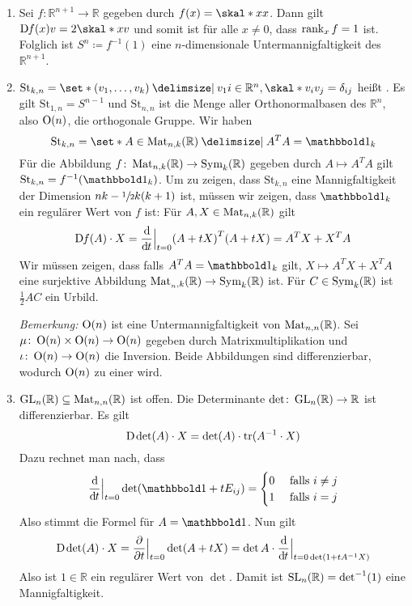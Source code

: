\begin{beispiel}
	\begin{enumerate}[1)]
		\item Sei $f \colon \mathbb{R}^{n+1} \to \mathbb{R}$ gegeben durch $f(x) = \skal*{x}{x}$.
		Dann gilt $\D f(x) v = 2 \skal*{x}{v}$ und somit ist für alle $x\neq 0$, dass $\rank_x f = 1$ ist.
		Folglich ist $S^n \coloneqq f^{-1}(1)$ eine $n$-dimensionale Untermannigfaltigkeit des $\mathbb{R}^{n+1}$.
		\item $\mathrm{St}_{k,n} = \set*{(v_1, \ldots,v_k) \given v_1i \in \mathbb{R}^n, \skal*{v_i}{v_j} = \delta_{ij}}$ heißt .
		Es gilt $\mathrm{St}_{1,n}=S^{n-1}$ und $\mathrm{St}_{n,n}$ ist die Menge aller Orthonormalbasen des $\mathbb{R}^n$, also $\On(n)$, die orthogonale Gruppe.
		Wir haben
		\[
			\mathrm{St}_{k,n} = \set*{A \in \Mat_{n,k}(\mathbb{R}) \given A^T A = \ind_k}
		\]
		Für die Abbildung $f \colon \Mat_{n,k}(\mathbb{R}) \to \Sym_{k}(\mathbb{R})$ gegeben durch $A \mapsto A^T A$ gilt $\mathrm{St}_{k,n} = f^{-1}(\ind_k)$.
		Um zu zeigen, dass $\mathrm{St}_{k,n}$ eine Mannigfaltigkeit der Dimension $nk - \sfrac{1}{2}k(k+1)$ ist, müssen wir zeigen, dass $\ind_k$ ein regulärer Wert von $f$ ist:
		Für $A,X \in \Mat_{n,k}(\mathbb{R})$ gilt
		\begin{align}
			\D f(A) \cdot X = \diffd{}{t}\Big|_{t=0} \enbrace*{A + tX}^T \enbrace*{A + tX} = A^T X+ X^T A
		\end{align}
		Wir müssen zeigen, dass falls $A^T A = \ind_k$ gilt, $X \mapsto A^T X + X^T A$ eine surjektive Abbildung $\Mat_{_n,k}(\mathbb{R}) \to \Sym_k(\mathbb{R})$ ist.
		Für $C \in \Sym_k(\mathbb{R})$ ist $\frac{1}{2} AC$ ein Urbild.
		
		\emph{Bemerkung:} $\On(n)$ ist eine Untermannigfaltigkeit von $\Mat_{n,n}(\mathbb{R})$.
		Sei $\mu \colon \On(n) \times \On(n) \to \On(n)$ gegeben durch Matrixmultiplikation und $\iota \colon \On(n) \to \On(n)$ die Inversion.
		Beide Abbildungen sind differenzierbar, wodurch $\On(n)$ zu einer  wird.
		\item $\GL_n(\mathbb{R}) \subseteq \Mat_{n,n}(\mathbb{R})$ ist offen.
		Die Determinante $\det \colon \GL_n(\mathbb{R}) \to \mathbb{R}$ ist differenzierbar.
		Es gilt
		\[
			\D \det (A) \cdot X = \det (A) \cdot \tr(A^{-1} \cdot X)
		\]
		Dazu rechnet man nach, dass 
		\[
			\diffd{}{t}\Big|_{t=0} \det \enbrace*{\ind + t E_{ij}} = \begin{cases}
				0 &\text{ falls }i \neq j\\
				1 &\text{ falls } i =j
			\end{cases}
		\]
		Also stimmt die Formel für $A=\ind$.
		Nun gilt
		\[
			\D \det(A) \cdot X = \diff{}{t}\Big|_{t=0} \det (A + tX) = \det A \cdot \diffd{}{t}\Big|_{t=0 \det \enbrace*{1 + tA^{-1} X}}
		\]
		Also ist $1 \in \mathbb{R}$ ein regulärer Wert von $\det$.
		Damit ist $\SL_n(\mathbb{R}) = \det^{-1}(1)$ eine Mannigfaltigkeit.
	\end{enumerate}
\end{beispiel}



